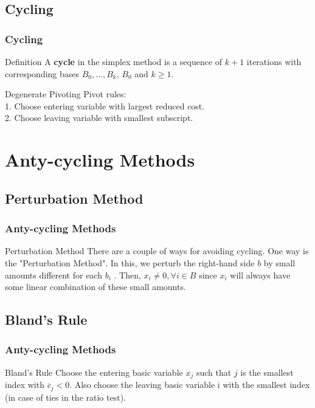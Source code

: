 \documentclass{beamer}
\begin{document}
\subsection{Cycling}
\begin{frame}\frametitle{Cycling}
\begin{block}{Definition}
A \textbf{cycle} in the simplex method is a sequence of $k + 1$ iterations with corresponding bases $B_0, ... , B_k$, $B_0$ and $k \geq 1$.
\end{block}
\begin{block}{Degenerate Pivoting}
Pivot rules: \\
1. Choose entering variable with largest reduced cost. \\
2. Choose leaving variable with smallest subscript.
\end{block}
\end{frame}

\section{Anty-cycling Methods}
\subsection{Perturbation Method}
\begin{frame}\frametitle{Anty-cycling Methods}
\begin{block}{Perturbation Method}
There are a couple of ways for avoiding cycling. One way is the "Perturbation Method". In this, we perturb the right-hand side $b$ by small amounts different for each $b_i$ . Then, $x_i \neq 0, \forall i \in B$ since $x_i$ will always have some linear combination of these small amounts.
\end{block}
\end{frame}

\subsection{Bland's Rule}
\begin{frame}\frametitle{Anty-cycling Methods}
\begin{block}{Bland's Rule}
Choose the entering basic variable $x_j$ such that $j$ is the smallest index with $\overline{c}_j < 0$. Also choose the leaving basic variable i with the smallest index (in case of ties in the ratio test).
\end{block}
\end{frame}
\end{document}

